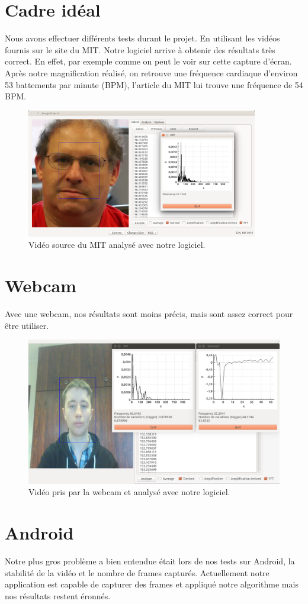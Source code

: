 \section{Cadre idéal}

Nous avons effectuer différents tests durant le projet. En utilisant les vidéos fournis sur le site du MIT. Notre logiciel arrive à obtenir des 
résultats très correct. En effet, par exemple comme on peut le voir sur cette capture d'écran. Après notre magnification réalisé, on retrouve
une fréquence cardiaque d'environ 53 battements par minute (BPM), l'article du MIT lui trouve une fréquence de 54 BPM.  

\begin{figure}[h!]
	\centering
	\includegraphics[width=0.9\textwidth]{data/cas-ideal.png}
	\caption{Vidéo source du MIT analysé avec notre logiciel.}
\end{figure}


\section{Webcam}

Avec une webcam, nos résultats sont moins précis, mais sont assez correct pour être utiliser. 

\begin{figure}[h!]
	\centering
	\includegraphics[width=1\textwidth]{data/webcam.png}
	\caption{Vidéo pris par la webcam et analysé avec notre logiciel.}
\end{figure}

\section{Android}

Notre plus gros problème a bien entendue était lors de nos tests sur Android, la stabilité de la vidéo et le nombre de frames capturés.
Actuellement notre application est capable de capturer des frames et appliqué notre algorithme mais nos résultats restent éronnés.

